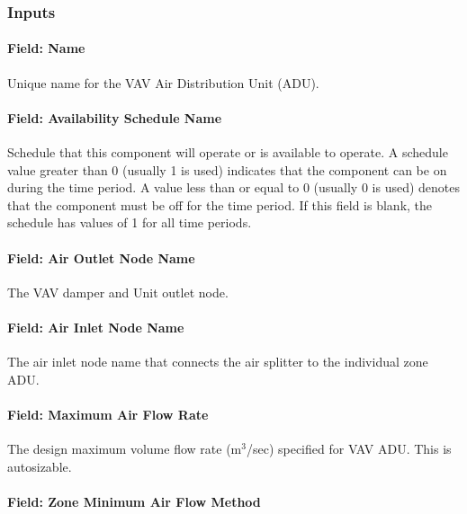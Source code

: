 \subsubsection{Inputs}\label{inputs-5-000}

\paragraph{Field: Name}\label{field-name-5-000}

Unique name for the VAV Air Distribution Unit (ADU).

\paragraph{Field: Availability Schedule Name}\label{field-availability-schedule-name-5}

Schedule that this component will operate or is available to operate. A schedule value greater than 0 (usually 1 is used) indicates that the component can be on during the time period. A value less than or equal to 0 (usually 0 is used) denotes that the component must be off for the time period. If this field is blank, the schedule has values of 1 for all time periods.

\paragraph{Field: Air Outlet Node Name}\label{field-air-outlet-node-name-4}

The VAV damper and Unit outlet node.

\paragraph{Field: Air Inlet Node Name}\label{field-air-inlet-node-name-4}

The air inlet node name that connects the air splitter to the individual zone ADU.

\paragraph{Field: Maximum Air Flow Rate}\label{field-maximum-air-flow-rate-4}

The design maximum volume flow rate (m\(^{3}\)/sec) specified for VAV ADU. This is autosizable.

\paragraph{Field: Zone Minimum Air Flow Method}\label{field-zone-minimum-air-flow-method-1}

